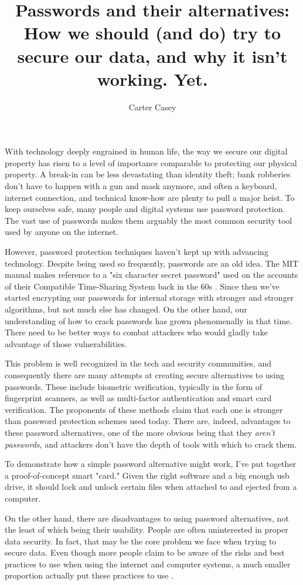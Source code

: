 \documentclass[12pt]{apa6}
\title{Passwords and their alternatives: How we should (and do) try to secure our data, and why it isn't working. Yet.}
\author{Carter Casey}
\affiliation{Mentor: Ming Chow \\ Tufts University Department of Computer Science}
\begin{document}
\maketitle
With technology deeply engrained in human life, the way we secure our digital property has risen to a level of importance comparable to protecting our physical property. A break-in can be less devastating than identity theft; bank robberies don't have to happen with a gun and mask anymore, and often a keyboard, internet connection, and technical know-how are plenty to pull a major heist. To keep ourselves safe, many people and digital systems use password protection. The vast use of passwords makes them arguably the most common security tool used by anyone on the internet.

However, password protection techniques haven't kept up with advancing technology. Despite being used so frequently, passwords are an old idea. The MIT manual makes reference to a "six character secret password" used on the accounts of their Compatible Time-Sharing System back in the 60s \parencite{mit65}. Since then we've started encrypting our passwords for internal storage with stronger and stronger algorithms, but not much else has changed. On the other hand, our understanding of how to crack passwords has grown phenomenally in that time. There need to be better ways to combat attackers who would gladly take advantage of those vulnerabilities.

This problem is well recognized in the tech and security communities, and consequently there are many attempts at creating secure alternatives to using passwords. These include biometric verification, typically in the form of fingerprint scanners, as well as multi-factor authentication and smart card verification. The proponents of these methods claim that each one is stronger than password protection schemes used today. There are, indeed, advantages to these password alternatives, one of the more obvious being that they \textit{aren't passwords}, and attackers don't have the depth of tools with which to crack them.

To demonstrate how a simple password alternative might work, I've put together a proof-of-concept smart "card." Given the right software and a big enough usb drive, it should lock and unlock certain files when attached to and ejected from a computer.

On the other hand, there are disadvantages to using password alternatives, not the least of which being their usability. People are often uninterested in proper data security. In fact, that may be the core problem we face when trying to secure data. Even though more people claim to be aware of the risks and best practices to use when using the internet and computer systems, a much smaller proportion actually put these practices to use \parencite{mcafee}.

\printbibliography
\end{document}
